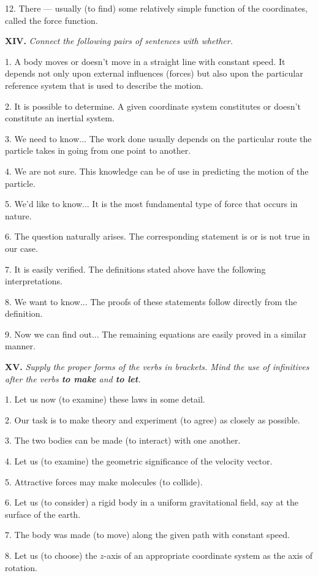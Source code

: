 \documentclass[a4paper]{article}
\newcommand{\ETask}[2]{\medskip\par\textbf{#1.} \textit{#2}\par}
\begin{document}
12. There --- usually (to find) some relatively simple function of the coordinates, called the force function.

\ETask{XIV}{Connect the following pairs of sentences with whether.}

1. A body moves or doesn't move in a straight line with constant speed. It depends not only upon external influences
(forces) but also upon the particular reference system that is used to describe the motion.

2. It is possible to determine. A given coordinate system constitutes or doesn't constitute an inertial system.

3. We need to know... The work done usually depends on the particular route the particle takes in going from one point to another.

4. We are not sure. This knowledge can be of use in predicting the motion of the particle.

5. We'd like to know... It is the most fundamental type of force that occurs in nature.

6. The question naturally arises. The corresponding statement is or is not true in our case.

7. It is easily verified. The definitions stated above have the following interpretations.

8. We want to know... The proofs of these statements follow directly from the definition.

9. Now we can find out... The remaining equations are easily proved in a similar manner.

\ETask{XV}{Supply the proper forms of the verbs in brackets. Mind the use of infinitives after the verbs \textbf{to make}
and \textbf{to let}.}

1. Let us now (to examine) these laws in some detail.

2. Our task is to make theory and experiment (to agree) as closely as possible.

3. The two bodies can be made (to interact) with one another.

4. Let us (to examine) the geometric significance of the velocity vector.

5. Attractive forces may make molecules (to collide).

6. Let us (to consider) a rigid body in a uniform gravitational field, say at the surface of the earth.

7. The body was made (to move) along the given path with constant speed.

8. Let us (to choose) the $z$-axis of an appropriate coordinate system as the axis of rotation.
\end{document}
